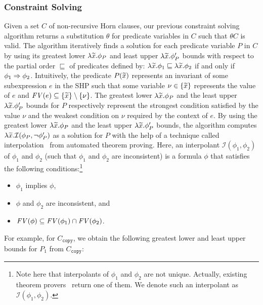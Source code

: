 \subsubsection{Constraint Solving}
\label{sec:cs}

Given a set \(C\) of non-recursive Horn clauses, our previous constraint
solving algorithm returns a substitution \(\theta\) for predicate
variables in \(C\) such that \(\theta C\) is valid.
The algorithm iteratively finds a solution for each predicate variable
\(P\) in \(C\) by using its greatest lower \(\lambda \widetilde{x}.\phi_{P}\)
and least upper \(\lambda \widetilde{x}.\phi_{P}'\) bounds with respect to the
partial order \(\sqsubseteq\) of predicates defined by: \(\lambda
\widetilde{x}.\phi_1 \sqsubseteq \lambda \widetilde{x}.\phi_2\) if and only if
\(\phi_1 \Rightarrow \phi_2\).
%
Intuitively, the predicate \(P(\widetilde{x})\) represents an invariant of
some subexpression \(e\) in the SHP such that some variable \(\nu \in
\{{\widetilde{x}}\}\) represents the value of \(e\) and \(\mathit{FV}({e}) \subseteq
\{{\widetilde{x}}\} \setminus \{{\nu}\}\).  The greatest lower \(\lambda
\widetilde{x}.\phi_P\) and the least upper \(\lambda \widetilde{x}.\phi_{P}'\)
bounds for \(P\) respectively represent the strongest condition
satisfied by the value \(\nu\) and the weakest condition on \(\nu\)
required by the context of \(e\).
%
By using the greatest lower \(\lambda \widetilde{x}.\phi_{P}\) and the least
upper \(\lambda \widetilde{x}.\phi_{P}'\) bounds, the algorithm computes
\(\lambda \widetilde{x}.\mathcal{I}(\phi_P,\neg \phi_P')\) as a solution for
\(P\) with the help of a technique called
interpolation~\cite{Henzinger2004,McMillan2005} from automated theorem
proving.  Here, an interpolant \(\mathcal{I}(\phi_1,\phi_2)\) of
\(\phi_1\) and \(\phi_2\) (such that \(\phi_1\) and \(\phi_2\) are
inconsistent) is a formula \(\phi\) that satisfies the following
conditions:\footnote{Note here that interpolants of \(\phi_1\) and
\(\phi_2\) are not unique.  Actually, existing theorem
provers~\cite{Henzinger2004,McMillan2005,Beyer2008} return one of them.
We denote such an interpolant as \(\mathcal{I}(\phi_1,\phi_2)\).}
\begin{itemize}
\item \(\phi_1\) implies \(\phi\),
\item \(\phi\) and \(\phi_2\) are inconsistent, and
\item \(\mathit{FV}({\phi}) \subseteq \mathit{FV}({\phi_1}) \cap \mathit{FV}({\phi_2})\).
\end{itemize}
%
For example, for \(C_{\texttt{copy}}\), we obtain the following greatest
lower and least upper bounds for \(P_1\) from \(C_{\texttt{copy}}\):
